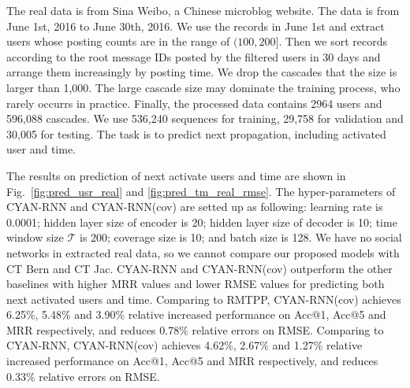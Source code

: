 The real data is from Sina Weibo, a Chinese microblog website.
The data is from June 1st, 2016 to June 30th, 2016. We use the records in June
1st and extract users whose posting counts are in the range of $(100,
200]$. Then we sort records according to the root
message IDs posted by the filtered users in 30 days and arrange them increasingly
by posting time. We drop the cascades that the size is larger
than 1,000. The large cascade size may dominate the training process,
who rarely occurrs in practice. 
Finally, the processed data contains 2964 users and 596,088 cascades. 
We use 536,240 sequences for training, 29,758 for validation and 30,005 for
testing. The task is to predict next propagation, including activated user and
time. 

The results on prediction of next
activate users and time are shown in Fig.~\ref{fig:pred_usr_real} and
\ref{fig:pred_tm_real_rmse}. The hyper-parameters of CYAN-RNN and CYAN-RNN(cov)
are setted up as following: learning rate is 0.0001; hidden layer size of
encoder is 20; hidden layer size of decoder is 10; time window size $\mathcal T$ is 200; coverage
size is 10; and batch size is 128. We have no social
networks in extracted real data, so we cannot compare our proposed models with
CT Bern and CT Jac. CYAN-RNN and CYAN-RNN(cov) outperform the other baselines
with higher MRR values and lower RMSE values for predicting both next activated
users and time. Comparing to RMTPP, CYAN-RNN(cov) achieves 6.25\%, 5.48\% and
3.90\% relative increased performance on Acc@1, Acc@5 and MRR respectively, and
reduces 0.78\% relative errors on RMSE. Comparing to CYAN-RNN, CYAN-RNN(cov)
achieves 4.62\%, 2.67\% and 1.27\% relative increased performance on Acc@1,
Acc@5 and MRR respectively, and reduces 0.33\% relative errors on RMSE.


